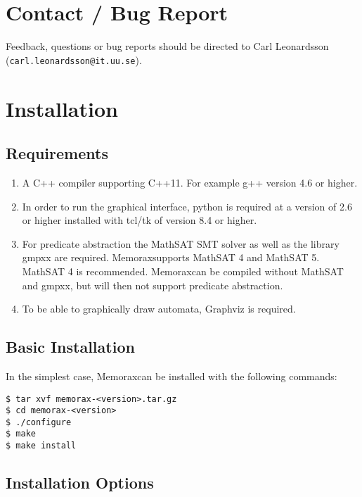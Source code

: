 \documentclass[a4paper]{article}
\newcommand{\tool}{Memorax} %
\begin{document}
\section{Contact / Bug Report}

Feedback, questions or bug reports should be directed to Carl
Leonardsson ({\tt carl.leonardsson@it.uu.se}).

\section{Installation}

\subsection{Requirements}

\begin{enumerate}

  \item A C++ compiler supporting C++11. For example g++ version 4.6 or
     higher.

  \item In order to run the graphical interface, python is required at a
     version of 2.6 or higher installed with tcl/tk of version 8.4 or
     higher.

  \item For predicate abstraction the MathSAT SMT solver as well as the
     library gmpxx are required. \tool supports MathSAT 4 and 
     MathSAT 5. MathSAT 4 is recommended. \tool can be compiled without
     MathSAT and gmpxx, but will then not support predicate
     abstraction.

  \item To be able to graphically draw automata, Graphviz is required.
\end{enumerate}

\subsection{Basic Installation}

   In the simplest case, \tool can be installed with the following
   commands:

\begin{verbatim}
$ tar xvf memorax-<version>.tar.gz
$ cd memorax-<version>
$ ./configure
$ make
$ make install
\end{verbatim}

\subsection{Installation Options}
\end{document}
